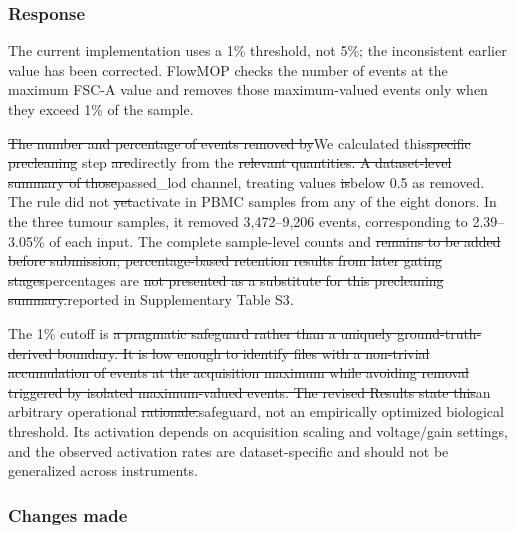 \documentclass[
  11pt,
  a4paper,
]{article}
\begin{document}
\subsubsection{Response}\label{response-13}

The current implementation uses a 1\% threshold, not 5\%; the
inconsistent earlier value has been corrected. FlowMOP checks the number
of events at the maximum FSC-A value and removes those maximum-valued
events only when they exceed 1\% of the sample.

{\color{revisionred}\sout{The number and percentage of events removed
by}}{\color{revisionblue}We calculated}
this{\color{revisionred}\sout{specific precleaning}} step
{\color{revisionred}\sout{are}}{\color{revisionblue}directly from} the
{\color{revisionred}\sout{relevant quantities. A dataset-level summary
of those}}{\color{revisionblue}passed\_lod channel, treating} values
{\color{revisionred}\sout{is}}{\color{revisionblue}below 0.5 as removed.
The rule did} not
{\color{revisionred}\sout{yet}}{\color{revisionblue}activate in PBMC
samples from any of the eight donors. In the three tumour samples, it
removed 3,472--9,206 events, corresponding to 2.39--3.05\% of each
input. The} complete {\color{revisionblue}sample-level counts} and
{\color{revisionred}\sout{remains to be added before submission;
percentage-based retention results from later gating
stages}}{\color{revisionblue}percentages} are
{\color{revisionred}\sout{not presented as a substitute for this
precleaning summary.}}{\color{revisionblue}reported in Supplementary
Table S3.}

The 1\% cutoff is {\color{revisionred}\sout{a pragmatic safeguard rather
than a uniquely ground-truth-derived boundary. It is low enough to
identify files with a non-trivial accumulation of events at the
acquisition maximum while avoiding removal triggered by isolated
maximum-valued events. The revised Results state
this}}{\color{revisionblue}an arbitrary} operational
{\color{revisionred}\sout{rationale.}}{\color{revisionblue}safeguard,
not an empirically optimized biological threshold. Its activation
depends on acquisition scaling and voltage/gain settings, and the
observed activation rates are dataset-specific and should not be
generalized across instruments.}

\subsubsection{Changes made}\label{changes-made-13}
\end{document}
